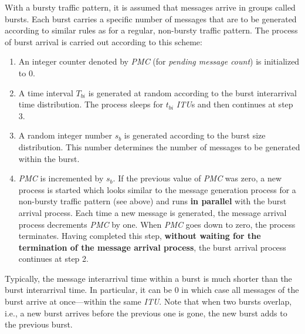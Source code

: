 With a bursty traffic pattern, it is assumed that messages arrive in
groups called bursts.
Each burst carries a specific number of messages that are to be generated
according to similar rules as for a regular, non-bursty traffic pattern.
The process of burst arrival is carried out according to this scheme:
\begin{enumerate}
\item
An integer counter denoted by {\em PMC\/} (for {\em pending message count\/})
is initialized to 0.
\item
A time interval $T_{bi}$
is generated at random according to the burst
interarrival time distribution.
The process sleeps for $t_{bi}$
{\em ITU\/}s and then continues at step 3.
\item
A random integer number $s_b$ is generated according to the burst size
distribution.
This number determines the number of messages to be generated within the burst.
\item
{\em PMC\/} is incremented by $s_b$.
If the previous value of {\em PMC\/} was zero, a new process is started which
looks
similar to the message generation process for a non-bursty traffic pattern (see
above) and runs {\bf in parallel} with the burst arrival process.
Each time a new message is generated, the message arrival process decrements
{\em PMC\/} by one.
When {\em PMC\/} goes down to zero, the process terminates.
Having completed this step, {\bf without waiting for the termination of the
message arrival process}, the burst arrival process continues at step 2.
\end{enumerate}

Typically, the message interarrival time within a burst is much shorter than
the burst interarrival time.
In particular, it can be 0 in which case all messages of the burst arrive
at once---within the same {\em ITU}.
Note that when two bursts overlap, i.e., a new burst arrives before the
previous one is gone, the new burst adds to the previous burst.

